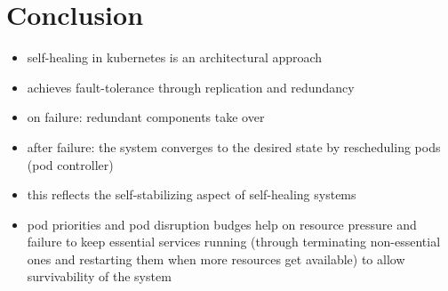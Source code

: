 
\section{Conclusion}
  \begin{itemize}
    \item self-healing in \gls{kubernetes} is an architectural approach
    \item achieves fault-tolerance through replication and redundancy
    \item on failure: redundant components take over
    \item after failure: the system converges to the desired state by rescheduling pods (pod controller)
    \item this reflects the self-stabilizing aspect of self-healing systems
    \item pod priorities and pod disruption budges help on resource pressure and failure to keep essential services running (through terminating non-essential ones and restarting them when more resources get available) to allow survivability of the system
  \end{itemize}